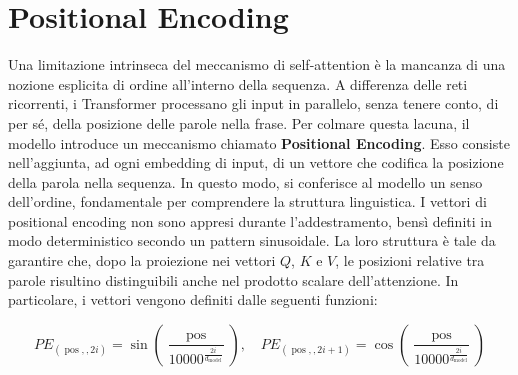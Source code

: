 \section{Positional Encoding}

Una limitazione intrinseca del meccanismo di self-attention è la mancanza di una nozione esplicita di ordine all'interno della sequenza. A differenza delle reti ricorrenti, i Transformer processano gli input in parallelo, senza tenere conto, di per sé, della posizione delle parole nella frase. Per colmare questa lacuna, il modello introduce un meccanismo chiamato \textbf{Positional Encoding}. Esso consiste nell’aggiunta, ad ogni embedding di input, di un vettore che codifica la posizione della parola nella sequenza. In questo modo, si conferisce al modello un senso dell’ordine, fondamentale per comprendere la struttura linguistica. I vettori di positional encoding non sono appresi durante l'addestramento, bensì definiti in modo deterministico secondo un pattern sinusoidale. La loro struttura è tale da garantire che, dopo la proiezione nei vettori $Q$, $K$ e $V$, le posizioni relative tra parole risultino distinguibili anche nel prodotto scalare dell'attenzione. In particolare, i vettori vengono definiti dalle seguenti funzioni:

\begin{equation}
    PE_{(\operatorname{pos},,2i)} = \sin\left(\frac{\operatorname{pos}}{10000^{\frac{2i}{d_{\operatorname{model}}}}}\right), \quad
    PE_{(\operatorname{pos},,2i+1)} = \cos\left(\frac{\operatorname{pos}}{10000^{\frac{2i}{d_{\operatorname{model}}}}}\right)
\end{equation}

